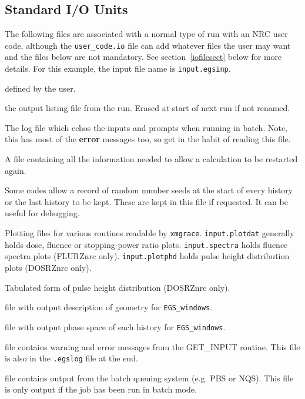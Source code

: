 \documentclass[12pt,twoside]{article}  %
\begin{document}
\subsection{Standard I/O Units}
\label{iounits}
The following files are associated with a normal type of run with an NRC
user code, although the {\tt user\_code.io} file can add whatever files 
the user
may want and the files below are not mandatory.  See section~\ref{iofilesect}
below for more details.  For
this example, the input file name is \verb+input.egsinp+.
\begin{description}

\item [input.egsinp:] defined by the user.

\item [input.egslst:]  the output listing file from the run. Erased
at start of next run if not renamed.

\item [input.egslog:] The log file which echos the inputs and
prompts when running in batch. Note, this has most of the {\bf error}
messages too, so get in the habit of reading this file.

\item [input.egsdat:] A file containing all the information needed to
allow a calculation to be restarted again.

\item [input.egsrns:] Some codes allow a record of random number seeds
at the start of every history or the last history to be kept. These are
kept in this file if requested. It can be useful for debugging.

\item [input.plotdat, input.spectra, input.plotphd:] Plotting files for 
various routines readable by \verb+xmgrace+.  {\tt input.plotdat} generally
holds dose, fluence or stopping-power ratio plots. {\tt input.spectra}
holds fluence spectra plots (FLURZnrc only).  {\tt input.plotphd} holds
pulse height distribution plots (DOSRZnrc only).

\item [input.egseff:] Tabulated form of pulse height distribution
(DOSRZnrc only).

\item [input.egsgeom:] file with output description of geometry for
\verb+EGS_windows+.

\item [input.egsgph:] file with output phase space of each history for
\verb+EGS_windows+.

\item[input.errors:] file contains warning and error messages from the
GET\_INPUT routine. This file is also in the {\tt .egslog} file at the end.

\item[input.eo:] file contains output from the batch queuing system
(e.g. PBS or NQS).  This file is only output if the job has been run
in batch mode. 
\end{description}
\end{document}
